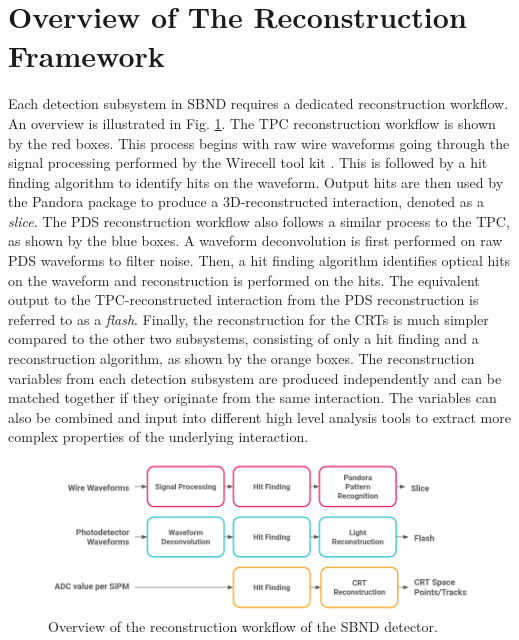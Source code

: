 
\section{Overview of The Reconstruction Framework}
\label{sec:reco_overview}

Each detection subsystem in SBND requires a dedicated reconstruction workflow.
An overview is illustrated in Fig. \ref{fig:Reco_Workflow}.
The TPC reconstruction workflow is shown by the red boxes.
This process begins with raw wire waveforms going through the signal processing performed by the Wirecell tool kit \cite{wirecell}.
This is followed by a hit finding algorithm to identify hits on the waveform.
Output hits are then used by the Pandora package \cite{pandora} to produce a 3D-reconstructed interaction, denoted as a \textit{slice}.
The PDS reconstruction workflow also follows a similar process to the TPC, as shown by the blue boxes.
A waveform deconvolution is first performed on raw PDS waveforms to filter noise.
Then, a hit finding algorithm identifies optical hits on the waveform and reconstruction is performed on the hits.
The equivalent output to the TPC-reconstructed interaction from the PDS reconstruction is referred to as a \textit{flash}.
Finally, the reconstruction for the CRTs is much simpler compared to the other two subsystems, consisting of only a hit finding and a reconstruction algorithm, as shown by the orange boxes.
The reconstruction variables from each detection subsystem are produced independently and can be matched together if they originate from the same interaction. 
The variables can also be combined and input into different high level analysis tools to extract more complex properties of the underlying interaction. 

\begin{figure}[htbp!] 
\centering    
\includegraphics[width=1.0\textwidth]{Reco_Workflow}
\caption[Reconstruction Framework of SBND]{
Overview of the reconstruction workflow of the SBND detector.
}
\label{fig:Reco_Workflow}
\end{figure}

